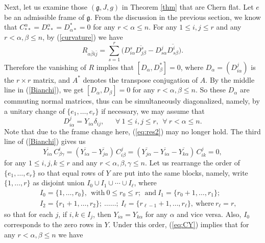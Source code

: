 \documentclass{amsart}
\begin{document}
Next, let us examine those $({\mathfrak g}, J,g)$ in Theorem \ref{thm} that are Chern flat. Let $e$ be an admissible frame of ${\mathfrak g}$. From the discussion in the previous section, we know that $C^{\alpha}_{\ast\ast}=D^{\alpha}_{\ast\ast} = D^{\ast}_{\alpha \ast}=0$ for any $r<\alpha \leq n$. For any $1\leq i,j\leq r$ and any $r<\alpha ,\beta\leq n$, by (\ref{curvature}) we have
$$ R_{\alpha \bar{\beta}i\bar{j}} = \sum_{s=1}^r \big( D^s_{i\alpha} \overline{D^s_{j\beta} } - D^j_{s\alpha} \overline{D^i_{s\beta} } \big) . $$
Therefore the vanishing of $R$ implies that $[D_{\alpha}, D^{\ast}_{\beta}]=0$, where $D_{\alpha} = (D^j_{i\alpha})$ is the $r\times r$ matrix, and $A^{\ast}$ denotes the transpose conjugation of $A$. By the middle line in (\ref{Bianchi}), we get $[D_{\alpha}, D_{\beta}]=0$ for any $r<\alpha, \beta \leq n$. So these $D_{\alpha}$ are commuting normal matrices, thus can be simultaneously diagonalized, namely, by a unitary change of $\{ e_1, \ldots , e_r\}$ if necessary, we may assume that
\begin{equation}  \label{eq:Y}
 D^j_{i\alpha }=Y_{i\alpha} \delta_{ij}, \ \ \ \ \ \ \ \forall \ 1\leq i,j\leq r, \ \ \forall \ r<\alpha \leq n. 
 \end{equation}
Note that due to the frame change here, (\ref{eq:res2}) may no longer hold. The third line of (\ref{Bianchi}) gives us
\begin{equation}  \label{eq:CY}
 \overline{Y_{i\alpha}} \,C^i_{\beta\gamma} = (\overline{Y_{i\alpha}} - \overline{Y_{j\alpha}})\, C^j_{i\beta} = (\overline{Y_{j\alpha}} - \overline{Y_{i\alpha}} - \overline{Y_{k\alpha}}) \,C^j_{ik} =0,  
 \end{equation}
for any $ 1\leq i,j,k\leq r$ and any $ r<\alpha, \beta, \gamma \leq n$. Let us rearrange the order of $\{ e_1, \ldots , e_r\}$ so that equal rows of $Y$ are put into the same blocks, namely, write $\{ 1, \ldots , r\}$ as disjoint union $I_0\cup I_1 \cup \cdots \cup I_{\ell}$, where 
\begin{eqnarray*}
&&  I_0=\{ 1, \ldots , r_0\},\  \  \mbox{with}  \ 0\leq r_0\leq r; \ \  \mbox{and} \ I_1=\{ r_0\!+\!1, \ldots , r_1\};\\
&&  I_2=\{ r_1\!+\!1, \ldots , r_2\}; \ \ldots \ldots ; \ I_{\ell}=\{r_{\ell\!-\!1}\!+\!1, \ldots , r_{\ell}\}, \ \mbox{where} \ r_{\ell}=r,
\end{eqnarray*}
so that for each $j$,  if $i,k\in I_j$, then $Y_{i\alpha}=Y_{k\alpha}$ for any $\alpha$ and vice versa. Also, $I_0$ corresponds to the zero rows in $Y$. Under this order, (\ref{eq:CY}) implies that for any $r<\alpha, \beta \leq n$ we have
\end{document}

